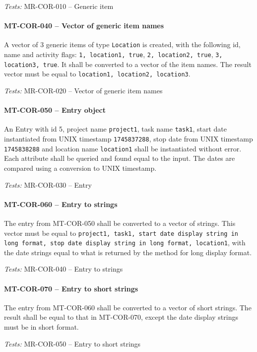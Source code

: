 \textit{Tests: } MR-COR-010 -- Generic item

\paragraph{MT-COR-040 -- Vector of generic item names}
A vector of 3 generic items of type \lstinline{Location} is created,
with the following id, name and activity flags:
\lstinline{1, location1, true}, \lstinline{2, location2, true},
\lstinline{3, location3, true}.
It shall be converted to a vector of the item names.
The result vector must be equal to \lstinline{location1, location2, location3}.

\textit{Tests: } MR-COR-020 -- Vector of generic item names

\paragraph{MT-COR-050 -- Entry object}
An Entry with id 5, project name \lstinline{project1}, task name
\lstinline{task1}, start date instantiated from UNIX timestamp
\lstinline{1745837288}, stop date from UNIX timestamp
\lstinline{1745838288} and location name \lstinline{location1}
shall be instantiated without error.
Each attribute shall be queried and found equal to the input.
The dates are compared using a conversion to UNIX timestamp.

\textit{Tests: } MR-COR-030 -- Entry

\paragraph{MT-COR-060 -- Entry to strings}
The entry from MT-COR-050 shall be converted to a vector of strings.
This vector must be equal to
\lstinline{project1, task1, start date display string in long format, stop date display string in long format, location1},
with the date strings equal to what is returned by the method for long
display format.

\textit{Tests: } MR-COR-040 -- Entry to strings

\paragraph{MT-COR-070 -- Entry to short strings}
The entry from MT-COR-060 shall be converted to a vector of short strings.
The result shall be equal to that in MT-COR-070, except the date display
strings must be in short format.

\textit{Tests: } MR-COR-050 -- Entry to short strings

